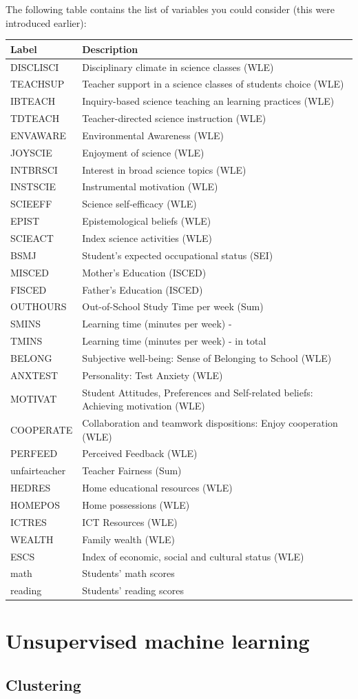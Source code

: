 \documentclass[]{book}
\begin{document}
The following table contains the list of variables you could consider (this were introduced earlier):

\begin{longtable}[]{@{}ll@{}}
\toprule
Label & Description\tabularnewline
\midrule
\endhead
DISCLISCI & Disciplinary climate in science classes (WLE)\tabularnewline
TEACHSUP & Teacher support in a science classes of students choice (WLE)\tabularnewline
IBTEACH & Inquiry-based science teaching an learning practices (WLE)\tabularnewline
TDTEACH & Teacher-directed science instruction (WLE)\tabularnewline
ENVAWARE & Environmental Awareness (WLE)\tabularnewline
JOYSCIE & Enjoyment of science (WLE)\tabularnewline
INTBRSCI & Interest in broad science topics (WLE)\tabularnewline
INSTSCIE & Instrumental motivation (WLE)\tabularnewline
SCIEEFF & Science self-efficacy (WLE)\tabularnewline
EPIST & Epistemological beliefs (WLE)\tabularnewline
SCIEACT & Index science activities (WLE)\tabularnewline
BSMJ & Student's expected occupational status (SEI)\tabularnewline
MISCED & Mother's Education (ISCED)\tabularnewline
FISCED & Father's Education (ISCED)\tabularnewline
OUTHOURS & Out-of-School Study Time per week (Sum)\tabularnewline
SMINS & Learning time (minutes per week) - \tabularnewline
TMINS & Learning time (minutes per week) - in total\tabularnewline
BELONG & Subjective well-being: Sense of Belonging to School (WLE)\tabularnewline
ANXTEST & Personality: Test Anxiety (WLE)\tabularnewline
MOTIVAT & Student Attitudes, Preferences and Self-related beliefs: Achieving motivation (WLE)\tabularnewline
COOPERATE & Collaboration and teamwork dispositions: Enjoy cooperation (WLE)\tabularnewline
PERFEED & Perceived Feedback (WLE)\tabularnewline
unfairteacher & Teacher Fairness (Sum)\tabularnewline
HEDRES & Home educational resources (WLE)\tabularnewline
HOMEPOS & Home possessions (WLE)\tabularnewline
ICTRES & ICT Resources (WLE)\tabularnewline
WEALTH & Family wealth (WLE)\tabularnewline
ESCS & Index of economic, social and cultural status (WLE)\tabularnewline
math & Students' math scores\tabularnewline
reading & Students' reading scores\tabularnewline
\bottomrule
\end{longtable}

\hypertarget{unsupervised-machine-learning}{%
\chapter{Unsupervised machine learning}\label{unsupervised-machine-learning}}

\hypertarget{clustering}{%
\section{Clustering}\label{clustering}}
\end{document}
